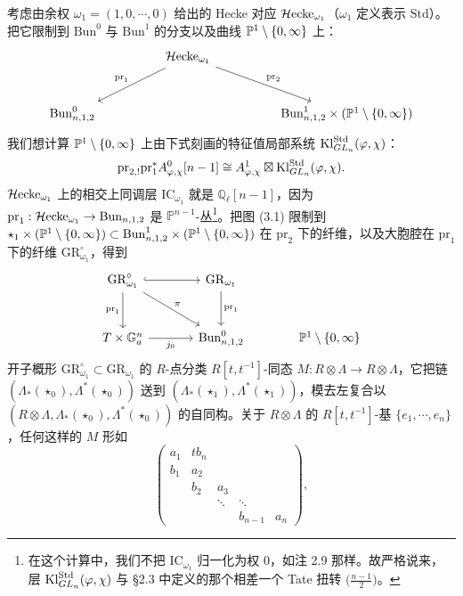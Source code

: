 考虑由余权 $\omega_1=(1,0,\cdots,0)$ 给出的 Hecke 对应 $\mathcal{H}\mathrm{ecke}_{\omega_1}$（$\omega_1$ 定义表示 $\mathrm{Std}$）。把它限制到 $\mathrm{Bun}^0$ 与 $\mathrm{Bun}^1$ 的分支以及曲线 $\mathbb{P}^1\setminus\{0,\infty\}$ 上：
\begin{equation}
\begin{tikzcd}[column sep=huge, row sep=large]
& \Hecke_{\omega_1} \arrow[dl, "\mathrm{pr}_1"'] \arrow[dr, "\mathrm{pr}_2"] & \\
\mathrm{Bun}^0_{n,1,2} & & \mathrm{Bun}^1_{n,1,2}\times(\PP^1\setminus\{0,\infty\})
\end{tikzcd}
\end{equation}
我们想计算 $\mathbb{P}^1\setminus\{0,\infty\}$ 上由下式刻画的特征值局部系统 $\mathrm{Kl}^{\mathrm{Std}}_{GL_n}(\varphi,\chi)$：
\[
\mathrm{pr}_{2,!}\mathrm{pr}_1^*A^0_{\varphi,\chi}[n-1]\cong A^1_{\varphi,\chi}\boxtimes\mathrm{Kl}^{\mathrm{Std}}_{GL_n}(\varphi,\chi).
\]
$\mathcal{H}\mathrm{ecke}_{\omega_1}$ 上的相交上同调层 $\mathrm{IC}_{\omega_1}$ 就是 $\mathbb{Q}_\ell[n-1]$，因为 $\mathrm{pr}_1:\mathcal{H}\mathrm{ecke}_{\omega_1}\to\mathrm{Bun}_{n,1,2}$ 是 $\mathbb{P}^{n-1}$-丛\footnote{在这个计算中，我们不把 $\mathrm{IC}_{\omega_1}$ 归一化为权 $0$，如注 2.9 那样。故严格说来，层 $\mathrm{Kl}^{\mathrm{Std}}_{GL_n}(\varphi,\chi)$ 与 §2.3 中定义的那个相差一个 Tate 扭转 $\big(\tfrac{n-1}{2}\big)$。}。把图 (3.1) 限制到 $\star_1\times(\mathbb{P}^1\setminus\{0,\infty\})\subset\mathrm{Bun}^1_{n,1,2}\times(\mathbb{P}^1\setminus\{0,\infty\})$ 在 $\mathrm{pr}_2$ 下的纤维，以及大胞腔在 $\mathrm{pr}_1$ 下的纤维 $\mathrm{GR}^\circ_{\omega_1}$，得到
\begin{equation}
\begin{tikzcd}[column sep=large, row sep=large]
\mathrm{GR}^\circ_{\omega_1} \arrow[r, hook] \arrow[d, "\mathrm{pr}_1"'] \arrow[dr, "\pi"] & \mathrm{GR}_{\omega_1} \arrow[d, "\mathrm{pr}_1"] & \\
T\times\mathbb{G}_a^n \arrow[r, "j_0"'] & \mathrm{Bun}^0_{n,1,2} & \PP^1\setminus\{0,\infty\}
\end{tikzcd}
\end{equation}
开子概形 $\mathrm{GR}^\circ_{\omega_1}\subset\mathrm{GR}_{\omega_1}$ 的 $R$-点分类 $R[t,t^{-1}]$-同态 $M:R\otimes\Lambda\to R\otimes\Lambda$，它把链 $(\Lambda_*(\star_0),\Lambda^*(\star_0))$ 送到 $(\Lambda_*(\star_1),\Lambda^*(\star_1))$，模去左复合以 $(R\otimes\Lambda,\Lambda_*(\star_0),\Lambda^*(\star_0))$ 的自同构。关于 $R\otimes\Lambda$ 的 $R[t,t^{-1}]$-基 $\{e_1,\cdots,e_n\}$，任何这样的 $M$ 形如
\[
\begin{pmatrix}
a_1 & tb_n & & \\
b_1 & a_2 & & \\
& b_2 & a_3 & \\
& & \ddots & \ddots\\
& & & b_{n-1} & a_n
\end{pmatrix},
\]
